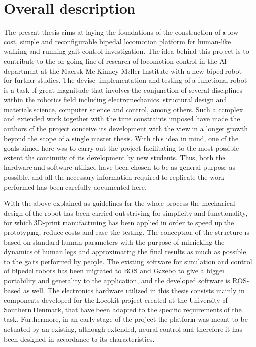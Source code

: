 
\section{Overall description}
\label{sec:overall_description}
The present thesis aims at laying the foundations of the construction of a low-cost, simple and reconfigurable bipedal locomotion platform for human-like walking and running gait control investigation. 
The idea behind this project is to contribute to the on-going line of research of locomotion control in the AI department at the Maersk Mc-Kinney Møller Institute with a new biped robot for further studies.
The devise, implementation and testing of a functional robot is a task of great magnitude that involves the conjunction of several disciplines within the robotics field including electromechanics, structural design and materials science, computer science and control, among others.
Such a complex and extended work together with the time constraints imposed have made the authors of the project conceive its development with the view in a longer growth beyond the scope of a single master thesis.
With this idea in mind, one of the goals aimed here was to carry out the project facilitating to the most possible extent the continuity of its development by new students. 
Thus, both the hardware and software utilized have been chosen to be as general-purpose as possible, and all the necessary information required to replicate the work performed has been carefully documented here.

With the above explained as guidelines for the whole process the mechanical design of the robot has been carried out striving for simplicity and functionality, for which 3D-print manufacturing has been applied in order to speed up the prototyping, reduce costs and ease the testing.
The conception of the structure is based on standard human parameters with the purpose of mimicking the dynamics of human legs and approximating the final results as much as possible to the gaits performed by people.
The existing software for simulation and control of bipedal robots has been migrated to ROS \cite{ros} and Gazebo \cite{gazebo} to give a bigger portability and generality to the application, and the developed software is ROS-based as well. 
The electronics hardware utilized in this thesis consists mainly in components developed for the Locokit project \cite{locokit} created at the University of Southern Denmark, that have been adapted to the specific requirements of the task.
Furthermore, in an early stage of the project the platform was meant to be actuated by an existing, although extended, neural control and therefore it has been designed in accordance to its characteristics.